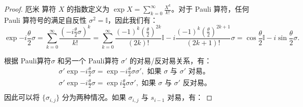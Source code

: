 \begin{proposition}
\begin{proof}
    厄米 算符 $X$ 的指数定义为 $\exp{X}=\sum_{k=0}^\infty\frac{X^k}{k!}$。对于 Pauli 算符，任何 Pauli 算符号的满足自反性 $\sigma^2=\mathbb{I}$，因此我们有：
    \begin{equation}
      \exp{-i \frac{\theta}{2} \sigma}=\sum_{k=0}^\infty\frac{(-i \frac{\theta}{2}\sigma)^k}{k!}=\sum_{k=0}^\infty\frac{(-1)^k (\frac{\theta}{2})^{2k}}{(2k)!} \mathbb{I}- i\frac{(-1)^k (\frac{\theta}{2})^{2k+1}}{(2k+1)!}\sigma=\cos{\frac{\theta}{2}}\mathbb{I}-i \sin{\frac{\theta}{2}}\sigma.
    \end{equation}
    
    根据 Pauli算符$\sigma$ 和另一个 Pauli算符 $\sigma'$ 的对易/反对易关系，有：
    \begin{equation}
    \begin{aligned}
    &\sigma'\exp{-i \frac{\theta}{2} \sigma}=\exp{-i \frac{\theta}{2} \sigma}\sigma',\text{ 如果 }\sigma\text{ 与 }\sigma'\text{ 对易。}\\
    &\sigma'\exp{-i \frac{\theta}{2} \sigma}=\exp{i \frac{\theta}{2} \sigma}\sigma',\text{ 如果 }\sigma\text{ 与 }\sigma'\text{ 反对易。}\\
    \end{aligned}
    \end{equation}
    因此可以将 $\{\sigma_{i,j}\}$ 分为两种情况。如果 $\sigma_{i,j}$ 与 $s_{i-1}$ 对易，有：
    

\end{proof}
\end{proposition}
